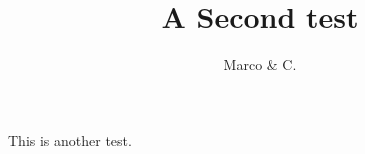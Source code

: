 \documentclass[DIV=9,fontsize=10pt,oneside,paper=a5]{scrartcl}
\title{A Second test}
\date{}
\author{Marco \& C.}
\begin{document}
\maketitle




This is another test.



\cleardoublepage

\thispagestyle{empty}
\strut
\vfill

\begin{center}





\end{center}
\end{document}
